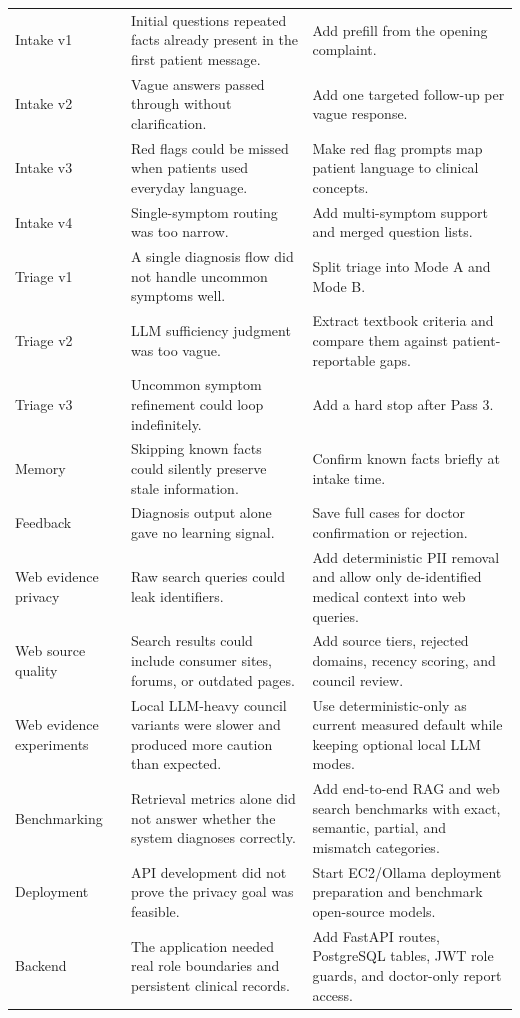 \begin{longtable}{p{} p{} p{}}
Intake v1 & Initial questions repeated facts already present in the first patient message. & Add prefill from the opening complaint.\\
Intake v2 & Vague answers passed through without clarification. & Add one targeted follow-up per vague response.\\
Intake v3 & Red flags could be missed when patients used everyday language. & Make red flag prompts map patient language to clinical concepts.\\
Intake v4 & Single-symptom routing was too narrow. & Add multi-symptom support and merged question lists.\\
Triage v1 & A single diagnosis flow did not handle uncommon symptoms well. & Split triage into Mode A and Mode B.\\
Triage v2 & LLM sufficiency judgment was too vague. & Extract textbook criteria and compare them against patient-reportable gaps.\\
Triage v3 & Uncommon symptom refinement could loop indefinitely. & Add a hard stop after Pass 3.\\
Memory & Skipping known facts could silently preserve stale information. & Confirm known facts briefly at intake time.\\
Feedback & Diagnosis output alone gave no learning signal. & Save full cases for doctor confirmation or rejection.\\
Web evidence privacy & Raw search queries could leak identifiers. & Add deterministic PII removal and allow only de-identified medical context into web queries.\\
Web source quality & Search results could include consumer sites, forums, or outdated pages. & Add source tiers, rejected domains, recency scoring, and council review.\\
Web evidence experiments & Local LLM-heavy council variants were slower and produced more caution than expected. & Use deterministic-only as current measured default while keeping optional local LLM modes.\\
Benchmarking & Retrieval metrics alone did not answer whether the system diagnoses correctly. & Add end-to-end RAG and web search benchmarks with exact, semantic, partial, and mismatch categories.\\
Deployment & API development did not prove the privacy goal was feasible. & Start EC2/Ollama deployment preparation and benchmark open-source models.\\
Backend & The application needed real role boundaries and persistent clinical records. & Add FastAPI routes, PostgreSQL tables, JWT role guards, and doctor-only report access.\\

\end{longtable}
